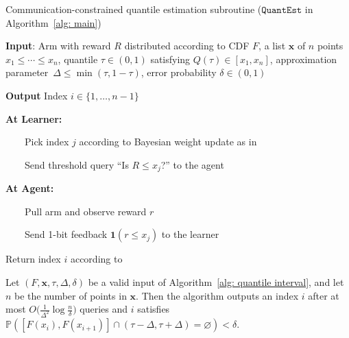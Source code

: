 \begin{algorithm}
    \caption{Communication-constrained quantile estimation subroutine ($\mathtt{QuantEst}$ in
Algorithm~\ref{alg: main})}
    \label{alg: quantile interval}

   \textbf{Input}: 
    Arm with reward $R$ distributed according to CDF $F$,
    a list $\mathbf{x}$ of $n$ points $x_1 \le  \cdots \le x_n$,
    quantile $\tau \in (0, 1)$ satisfying $Q(\tau) \in [x_1, x_n]$,
    approximation parameter~$\Delta \le \min(\tau, 1-\tau)$,
    error probability $\delta \in (0,1)$
    
    \textbf{Output} Index $i \in \{1, \dots, n-1\}$    

\begin{algorithmic}[1]
      

          \State \textbf{At Learner:}
          
          \State~~~~Pick index $j$
          according to Bayesian weight update as in~\cite{gretta2023sharp}
          
          \State~~~~Send threshold query 
          ``Is $R \le x_j$?'' to the agent

            \State \textbf{At Agent:}
          
          \State~~~~Pull arm and observe reward $r$
          
          \State~~~~Send 1-bit feedback $\mathbf{1}(r \le x_j)$ to the learner

        
        \EndFor

    \State Return index $i$  according to~\cite{gretta2023sharp}

\end{algorithmic}    
\end{algorithm}


\begin{corollary}
\label{cor: QuantEst guarantee}
Let $(F, \mathbf{x}, \tau, \Delta, \delta)$ be a valid input of Algorithm~\ref{alg: quantile interval}, and let~$n$ be the number of points in $\mathbf{x}$. 
Then the algorithm outputs  an index $i$ after at most
$O \big( \frac{1}{\Delta^2}  \log  \frac{n}{\delta} \big)$
queries and $i$  satisfies
    $\mathbb{P}
    \left([F(x_i), F(x_{i+1})] \cap  (\tau - \Delta, \tau + \Delta) = \varnothing \right) < \delta$.
\end{corollary}


